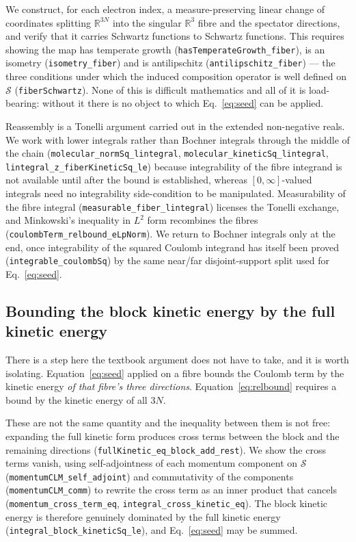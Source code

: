 \documentclass[aps,prd,reprint,nofootinbib,superscriptaddress]{revtex4-2}
\newcommand{\thm}[1]{\texttt{#1}}   %
\begin{document}
We construct, for each electron index, a measure-preserving linear change of coordinates splitting
$\mathbb{R}^{3N}$ into the singular $\mathbb{R}^{3}$ fibre and the spectator directions, and verify
that it carries Schwartz functions to Schwartz functions. This requires showing the map has temperate
growth (\thm{hasTemperateGrowth\_fiber}), is an isometry (\thm{isometry\_fiber}) and is antilipschitz
(\thm{antilipschitz\_fiber}) --- the three conditions under which the induced composition operator is
well defined on $\mathcal{S}$ (\thm{fiberSchwartz}). None of this is difficult mathematics and all of
it is load-bearing: without it there is no object to which Eq.~\eqref{eq:seed} can be applied.

Reassembly is a Tonelli argument carried out in the extended non-negative reals. We work with lower
integrals rather than Bochner integrals through the middle of the chain
(\thm{molecular\_normSq\_lintegral}, \thm{molecular\_kineticSq\_lintegral},
\thm{lintegral\_z\_fiberKineticSq\_le}) because integrability of the fibre integrand is not available
until after the bound is established, whereas $[0,\infty]$-valued integrals need no integrability
side-condition to be manipulated. Measurability of the fibre integral
(\thm{measurable\_fiber\_lintegral}) licenses the Tonelli exchange, and Minkowski's inequality in
$L^{2}$ form recombines the fibres (\thm{coulombTerm\_relbound\_eLpNorm}). We return to Bochner
integrals only at the end, once integrability of the squared Coulomb integrand has itself been proved
(\thm{integrable\_coulombSq}) by the same near/far disjoint-support split used for
Eq.~\eqref{eq:seed}.

\subsection{Bounding the block kinetic energy by the full kinetic energy}
\label{sec:cross-terms}

There is a step here the textbook argument does not have to take, and it is worth isolating.
Equation~\eqref{eq:seed} applied on a fibre bounds the Coulomb term by the kinetic energy \emph{of
that fibre's three directions}. Equation~\eqref{eq:relbound} requires a bound by the kinetic energy
of all $3N$.

These are not the same quantity and the inequality between them is not free: expanding the full
kinetic form produces cross terms between the block and the remaining directions
(\thm{fullKinetic\_eq\_block\_add\_rest}). We show the cross terms vanish, using self-adjointness of
each momentum component on $\mathcal{S}$ (\thm{momentumCLM\_self\_adjoint}) and commutativity of the
components (\thm{momentumCLM\_comm}) to rewrite the cross term as an inner product that cancels
(\thm{momentum\_cross\_term\_eq}, \thm{integral\_cross\_kinetic\_eq}). The block kinetic energy is
therefore genuinely dominated by the full kinetic energy (\thm{integral\_block\_kineticSq\_le}), and
Eq.~\eqref{eq:seed} may be summed.
\end{document}
